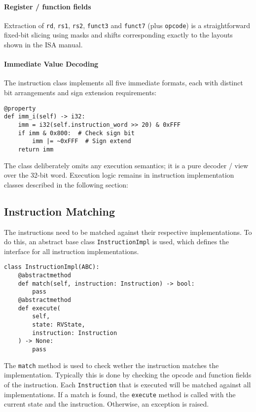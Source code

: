 \documentclass[sigconf]{acmart}
\begin{document}
\paragraph{Register / function fields} Extraction of \texttt{rd}, \texttt{rs1}, \texttt{rs2}, \texttt{funct3} and \texttt{funct7} (plus \texttt{opcode}) is a straightforward fixed-bit slicing using masks and shifts corresponding exactly to the layouts shown in the ISA manual. \cite{riscv-spec}

\paragraph{Immediate Value Decoding} The instruction class implements all five immediate formats, each with distinct bit arrangements and sign extension requirements:

\begin{verbatim}
@property
def imm_i(self) -> i32:
    imm = i32(self.instruction_word >> 20) & 0xFFF
    if imm & 0x800:  # Check sign bit
        imm |= ~0xFFF  # Sign extend
    return imm
\end{verbatim}

The class deliberately omits any execution semantics; it is a pure decoder / view over the 32-bit word. Execution logic remains in instruction implementation classes described in the following section:

\subsection{Instruction Matching}\label{sec:instruction-matching}
The instructions need to be matched against their respective implementations. To do this, an abstract base class \texttt{InstructionImpl} is used, which defines the interface for all instruction implementations.
\begin{verbatim}
class InstructionImpl(ABC):
    @abstractmethod
    def match(self, instruction: Instruction) -> bool:
        pass
    @abstractmethod
    def execute(
        self, 
        state: RVState, 
        instruction: Instruction
    ) -> None:
        pass
\end{verbatim}
The \texttt{match} method is used to check wether the instruction matches the implementation. Typically this is done by checking the opcode and function fields of the instruction.
Each \texttt{Instruction} that is executed will be matched against all implementations. 
If a match is found, the \texttt{execute} method is called with the current state and the instruction. Otherwise, an exception is raised.
\end{document}
